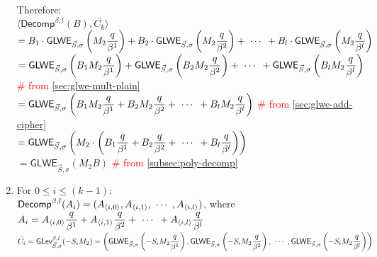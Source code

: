 \begin{enumerate}
Therefore: \\
$\langle \textsf{Decomp}^{\beta, l}(B), \bar{C_k} \rangle$\\
$= B_1 \cdot \textsf{GLWE}_{\vec{S}, \sigma} \left (M_{2}\dfrac{q}{\beta^1} \right ) + B_2 \cdot \textsf{GLWE}_{\vec{S}, \sigma} \left (M_{2}\dfrac{q}{\beta^2} \right ) + \text{ } \text{$\cdots$} \text{ } + B_l \cdot \textsf{GLWE}_{\vec{S}, \sigma} \left (M_{2}\dfrac{q}{\beta^l}\right)$ \\
$= \textsf{GLWE}_{\vec{S}, \sigma} \left (B_1M_{2}\dfrac{q}{\beta^1} \right ) + \textsf{GLWE}_{\vec{S}, \sigma} \left (B_2M_{2}\dfrac{q}{\beta^2} \right ) + \text{ } \text{$\cdots$} \text{ } + \textsf{GLWE}_{\vec{S}, \sigma} \left (B_lM_{2}\dfrac{q}{\beta^l}\right)$ \textcolor{red}{\# from \autoref{sec:glwe-mult-plain}} \\
$= \textsf{GLWE}_{\vec{S}, \sigma} \left (B_1M_{2}\dfrac{q}{\beta^1} + B_2M_{2}\dfrac{q}{\beta^2} + \text{ } \text{$\cdots$} \text{ } + B_lM_{2}\dfrac{q}{\beta^l}\right)$ \textcolor{red}{\# from \autoref{sec:glwe-add-cipher}}\\
$= \textsf{GLWE}_{\vec{S}, \sigma} \left (M_{2} \cdot \left ( B_1\dfrac{q}{\beta^1} + B_2\dfrac{q}{\beta^2} + \text{ } \text{$\cdots$} \text{ } + B_l\dfrac{q}{\beta^l} \right)\right)$ \\
$= \textsf{GLWE}_{\vec{S}, \sigma} (M_{2}B)$ \textcolor{red}{\# from \autoref{subsec:poly-decomp}}
\item For $0 \leq i \leq (k - 1)$: \\
$\textsf{Decomp}^{\beta, l}(A_i) = (A_{\langle i, 0 \rangle}, A_{\langle i, 1 \rangle}, \text{ } \text{$\cdots$} \text{ }, A_{\langle i, l \rangle})$, where $A_i = A_{\langle i, 0 \rangle}\dfrac{q}{\beta^1} + A_{\langle i, 1 \rangle}\dfrac{q}{\beta^2} + \text{ } \text{$\cdots$} \text{ } + A_{\langle i, l \rangle}\dfrac{q}{\beta^l}$ \\
$\bar{C_i} =  \textsf{GLev}_{\vec{S}, \sigma}^{\beta, l}(-S_iM_2) = \left(\textsf{GLWE}_{\vec{S}, \sigma}\left(-S_iM_2\dfrac{q}{\beta^1}\right), \textsf{GLWE}_{\vec{S}, \sigma}\left(-S_iM_2\dfrac{q}{\beta^2}\right), \text{ } \text{$\cdots$} \text{ }, \textsf{GLWE}_{\vec{S}, \sigma}\left(-S_iM_2\dfrac{q}{\beta^l}\right) \right)$ \\


\end{enumerate}
